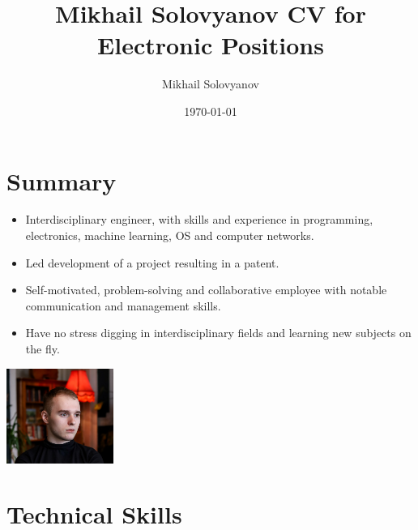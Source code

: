 \documentclass{article}
\title{ Mikhail Solovyanov CV for Electronic Positions}
\author{Mikhail Solovyanov}
\date{\today}
\begin{document}
 
\makecvtitle %

\section{Summary}
\begin{minipage}{0.7\textwidth}
   \begin{itemize}
      \item Interdisciplinary engineer,  with skills and experience in programming, electronics, machine learning, OS and computer networks.
      \item Led development of a project resulting in a patent.
      \item Self-motivated, problem-solving and collaborative employee with notable communication and management skills.
      \item Have no stress digging in interdisciplinary fields and learning new subjects on the fly.
      \end{itemize}
   \end{minipage}%
   \hfill
   \begin{minipage}{0.3\textwidth}
      \includegraphics[width=3.5cm,right]{picture.jpg}
\end{minipage}%



\section{Technical Skills}
 
\end{document}
